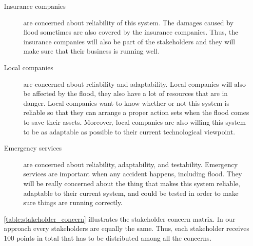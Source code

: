 \begin{description}
\item[Insurance companies] are concerned about reliability of this system. The damages caused by flood sometimes are also covered by the insurance companies. Thus, the insurance companies will also be part of the stakeholders and they will make sure that their business is running well.
\item[Local companies] are concerned about reliability and adaptability. Local companies will also be affected by the flood, they also have a lot of resources that are in danger. Local companies want to know whether or not this system is reliable so that they can arrange a proper action sets when the flood comes to save their assets. Moreover, local companies are also willing this system to be as adaptable as possible to their current technological viewpoint.
\item[Emergency services] are concerned about reliability, adaptability, and testability. Emergency services are important when any accident happens, including flood. They will be really concerned about the thing that makes this system reliable, adaptable to their current system, and could be tested in order to make sure things are running correctly.
\end{description}

\autoref{table:stakeholder_concern} illustrates the stakeholder concern matrix. In our approach every stakeholders are equally the same. Thus, each stakeholder receives 100 points in total that has to be distributed among all the concerns.

